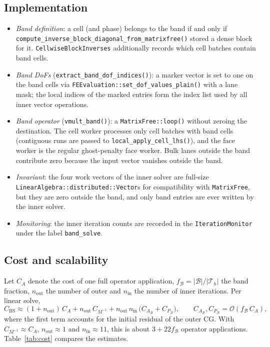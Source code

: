 \documentclass[11pt,a4paper]{article}
\newcommand{\Th}{\mathcal{T}_h}
\newcommand{\B}{\mathcal{B}}
\newcommand{\code}[1]{\nolinkurl{#1}}
\begin{document}
\subsection{Implementation}
\begin{itemize}[leftmargin=*]
  \item \emph{Band definition}: a cell (and phase) belongs to the band if and only if
        \code{compute_inverse_block_diagonal_from_matrixfree()} stored a dense block for it.
        \code{CellwiseBlockInverses} additionally records which cell batches contain band cells.
  \item \emph{Band DoFs} (\code{extract_band_dof_indices()}): a marker vector is set to one on the
        band cells via \code{FEEvaluation::set_dof_values_plain()} with a lane mask; the local
        indices of the marked entries form the index list used by all inner vector operations.
  \item \emph{Band operator} (\code{vmult_band()}): a \code{MatrixFree::loop()} without zeroing the
        destination. The cell worker processes only cell batches with band cells (contiguous runs
        are passed to \code{local_apply_cell_lhs()}), and the face worker is the regular
        ghost-penalty face worker. Bulk lanes outside the band contribute zero because the
        input vector vanishes outside the band.
  \item \emph{Invariant}: the four work vectors of the inner solver are full-size
        \code{LinearAlgebra::distributed::Vector}s for compatibility with \code{MatrixFree}, but they
        are zero outside the band, and only band entries are ever written by the inner solver.
  \item \emph{Monitoring}: the inner iteration counts are recorded in the \code{IterationMonitor}
        under the label \code{band_solve}.
\end{itemize}

\subsection{Cost and scalability}
Let $C_A$ denote the cost of one full operator application, $f_\B = |\B|/|\Th|$ the band fraction,
$n_{\mathrm{out}}$ the number of outer and $n_{\mathrm{in}}$ the number of inner iterations. Per
linear solve,
\begin{equation}
  C_{\mathrm{BS}} \approx (1+n_{\mathrm{out}})\,C_A + n_{\mathrm{out}}\,C_{M^{-1}}
  + n_{\mathrm{out}}\,n_{\mathrm{in}}\,\bigl(C_{A_\B}+C_{P_\B}\bigr),
  \qquad C_{A_\B}, C_{P_\B} = \mathcal{O}(f_\B\,C_A),
\end{equation}
where the first term accounts for the initial residual of the outer CG. With $C_{M^{-1}}\approx C_A$,
$n_{\mathrm{out}}\approx 1$ and $n_{\mathrm{in}}\approx 11$, this is about $3 + 22 f_\B$ operator
applications. Table~\ref{tab:cost} compares the estimates.
\end{document}
